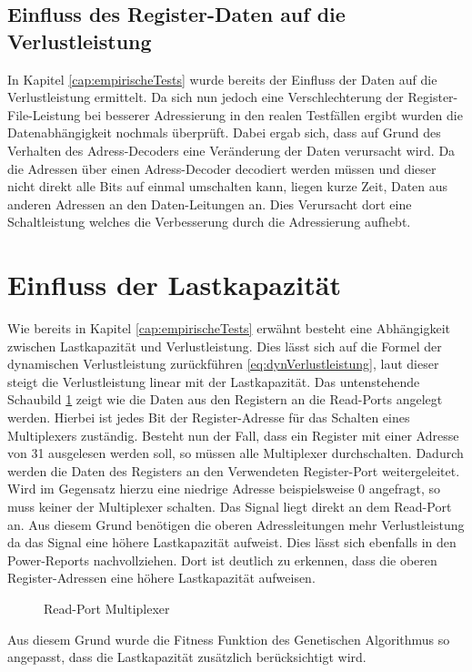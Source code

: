  


\subsection{Einfluss des Register-Daten auf die Verlustleistung}
In Kapitel \ref{cap:empirischeTests} wurde bereits der Einfluss der Daten auf die Verlustleistung ermittelt. Da sich nun jedoch eine Verschlechterung der Register-File-Leistung bei besserer Adressierung in den realen Testfällen ergibt wurden die Datenabhängigkeit nochmals überprüft. Dabei ergab sich, dass auf Grund des Verhalten des Adress-Decoders eine Veränderung der Daten verursacht wird. Da die Adressen über einen Adress-Decoder decodiert werden müssen und dieser nicht direkt alle Bits auf einmal umschalten kann, liegen kurze Zeit, Daten aus anderen Adressen an den Daten-Leitungen an. Dies Verursacht dort eine Schaltleistung welches die Verbesserung durch die Adressierung aufhebt.
%

\section{Einfluss der Lastkapazität}
 \label{cap:lastkapa}
Wie bereits in Kapitel \ref{cap:empirischeTests} erwähnt besteht eine Abhängigkeit zwischen Lastkapazität und Verlustleistung. Dies lässt sich auf die Formel der dynamischen Verlustleistung zurückführen \ref{eq:dynVerlustleistung}, laut dieser steigt die Verlustleistung linear mit der Lastkapazität.
Das untenstehende Schaubild \ref{fig:read_port_mux} zeigt wie die Daten aus den Registern an die Read-Ports angelegt werden. Hierbei ist jedes Bit der Register-Adresse für das Schalten eines Multiplexers zuständig. Besteht nun der Fall, dass ein Register mit einer Adresse von 31 ausgelesen werden soll, so müssen alle Multiplexer durchschalten. Dadurch werden die Daten des Registers an den Verwendeten Register-Port weitergeleitet. Wird im Gegensatz hierzu eine niedrige Adresse beispielsweise 0 angefragt, so muss keiner der Multiplexer schalten. Das Signal liegt direkt an dem Read-Port an. Aus diesem Grund benötigen die oberen Adressleitungen mehr Verlustleistung da das Signal eine höhere Lastkapazität aufweist. Dies lässt sich ebenfalls in den Power-Reports nachvollziehen. Dort ist deutlich zu erkennen, dass die oberen Register-Adressen eine höhere Lastkapazität aufweisen. 
\begin{scriptsize}
	\begin{figure}[htbp] 
		\centering
		
		\caption{Read-Port Multiplexer}
		\label{fig:read_port_mux}
	\end{figure}
\end{scriptsize}

Aus diesem Grund wurde die Fitness Funktion des Genetischen Algorithmus so angepasst, dass die Lastkapazität zusätzlich berücksichtigt wird.

